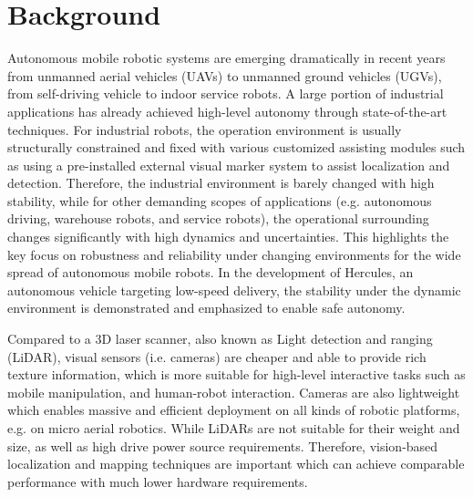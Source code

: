 \section{Background}
Autonomous mobile robotic systems are emerging dramatically in recent years from
unmanned aerial vehicles (UAVs) to unmanned ground vehicles (UGVs), from self-driving
vehicle to indoor service robots. A large portion of industrial applications has
already achieved high-level autonomy through state-of-the-art techniques. 
For industrial robots, the operation environment is usually structurally constrained and fixed with various customized assisting modules such as using a pre-installed external visual marker system to assist localization and detection. 
Therefore, the industrial environment is barely changed with high stability, 
while for other demanding scopes of applications (e.g. autonomous driving, warehouse robots, and service robots), the operational surrounding changes significantly with high dynamics and uncertainties. This highlights the key focus on robustness and reliability under changing environments for the wide spread of autonomous mobile robots. In the development of Hercules\cite{liuhercules}, an autonomous vehicle targeting low-speed delivery, the stability under the dynamic environment is demonstrated and emphasized to enable safe autonomy.

Compared to a 3D laser scanner, also known as Light detection and ranging (LiDAR), 
visual sensors (i.e. cameras) are cheaper and able to provide rich
texture information, which is more suitable for high-level interactive tasks such
as mobile manipulation, and human-robot interaction. Cameras are also lightweight which enables massive and efficient deployment on all kinds of robotic platforms, e.g. on micro aerial robotics. While LiDARs are not suitable for their weight and size, as well as high drive power source requirements. Therefore, vision-based localization and mapping techniques are important which can achieve comparable performance with much lower hardware requirements.

